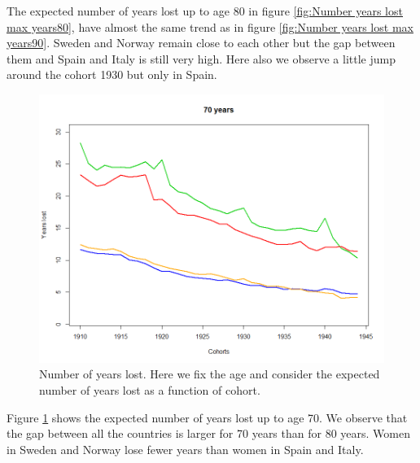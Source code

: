 The expected number of years lost up to age 80 in figure  \ref{fig:Number years lost max years80}, have almost the same trend as in figure \ref{fig:Number years lost max years90}.
Sweden and Norway remain close to each other but the gap between them and Spain and Italy is still very high.
Here also we observe a little jump around the cohort 1930 but only in Spain.
            
            
            
                              
              \begin{figure}[tbh]
             \centering
              \includegraphics[width=0.8\linewidth]{figures/antal_tapteAA_age70.png}
              \caption{Number of years lost. Here we fix the age and consider the expected number of years lost as a function of cohort.}
              \label{fig:Number years lost max years70 }
            \end{figure}          
 
                  
Figure \ref{fig:Number years lost max years70 } shows the expected number of years lost up to age 70. 
We observe that the gap between all the countries is larger for 70 years than for 80 years.
Women in Sweden and Norway lose fewer years than women in Spain and Italy.

            
            
            
                               
